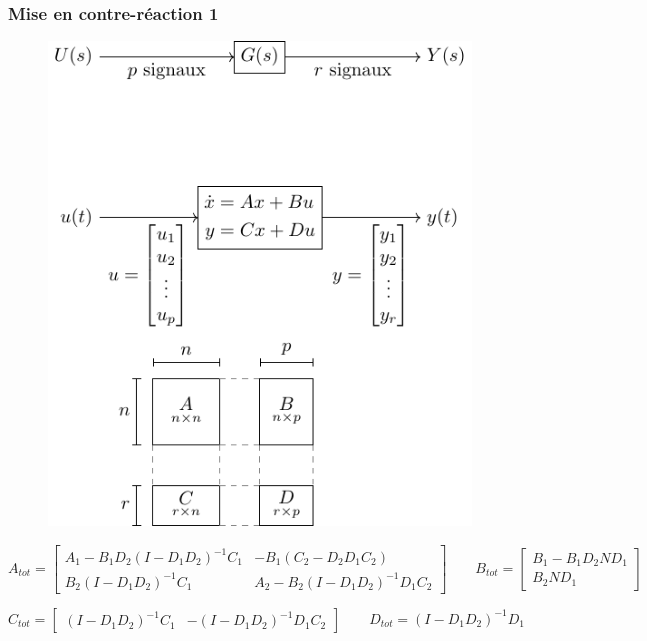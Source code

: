 \documentclass[resume]{subfiles}
\begin{document}
\subsubsection{Mise en contre-réaction 1}
\begin{figure}[H]
\centering
\includegraphics[scale=1,page=4]{drwg_0.pdf}
\end{figure}
$$A_{tot}=\begin{bmatrix} A_1 - B_1D_2(I-D_1D_2)^{-1}C_1 & -B_1(C_2-D_2D_1C_2)\\B_2(I-D_1D_2)^{-1}C_1 & A_2-B_2(I-D_1D_2)^{-1}D_1C_2\end{bmatrix}\qquad B_{tot}=\begin{bmatrix}B_1-B_1D_2ND_1\\B_2ND_1\end{bmatrix}$$

$$C_{tot}=\begin{bmatrix}(I-D_1D_2)^{-1}C_1 & -(I-D_1D_2)^{-1}D_1C_2\end{bmatrix}\qquad D_{tot}=(I-D_1D_2)^{-1}D_1$$ 
\end{document}
